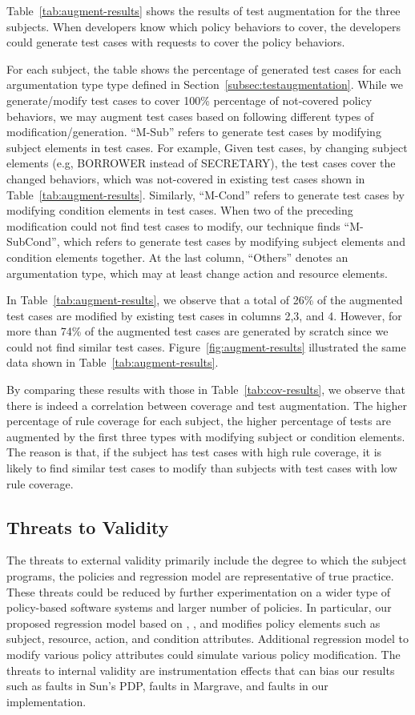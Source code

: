 Table~\ref{tab:augment-results} shows the results of test augmentation for the three subjects.
When developers know which policy behaviors to cover, the developers could generate
test cases with requests to cover the policy behaviors. 

For each subject, the table shows the percentage of
generated test cases for each argumentation type type defined in Section~\ref{subsec:testaugmentation}.
While we generate/modify test cases to cover 100\% percentage of not-covered
policy behaviors, we may augment test cases based on following different types of modification/generation.
``M-Sub'' refers to generate test cases by modifying
subject elements in test cases. For example, Given test cases, by changing subject elements (e.g,
BORROWER instead of SECRETARY),
the test cases cover the changed behaviors, which was not-covered in existing test cases
shown in Table~\ref{tab:augment-results}.
Similarly, ``M-Cond'' refers to generate test cases by modifying
condition elements in test cases.
When two of the preceding modification could not
find test cases to modify, our technique finds
``M-SubCond'', which refers to generate test cases by modifying
subject elements and condition elements together.
At the last column, ``Others'' denotes an argumentation type, which
may at least change action and resource elements.

In Table~\ref{tab:augment-results}, we observe that
a total of 26\% of the augmented test cases are modified by
existing test cases in columns 2,3, and 4. However,
for more than 74\% of the augmented test cases are
generated by scratch since we could not find similar
test cases.
Figure~\ref{fig:augment-results} illustrated
the same data shown in Table~\ref{tab:augment-results}.

By comparing these results with those in Table~\ref{tab:cov-results}, we observe that there is indeed a correlation between coverage and 
test augmentation.
The higher percentage of rule coverage for each subject,
the higher percentage of tests are augmented
by the first three types with modifying subject
or condition elements.
The reason is that, if the subject has test cases with high rule coverage, it is likely
to find similar test cases to modify than subjects with test cases with low rule coverage.

\subsection{Threats to Validity}
The threats to external validity primarily include the degree to
which the subject programs, the policies and regression model are representative of true practice.
These threats
could be reduced by further experimentation on a wider type of policy-based software systems and
larger number of policies.
In particular, our proposed regression model based on , ,
and  modifies policy elements such as subject, resource, action, and condition attributes.
Additional regression model to modify various policy attributes could
simulate various policy modification.
The threats to internal validity are instrumentation effects
that can bias our results such as faults in Sun's PDP, faults in Margrave, and
faults in our implementation.


